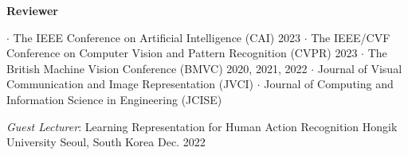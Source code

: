 



\textbf{Reviewer}
\begin{cvskills}
\cvskill
{} %
{\hspace{-3em} \textbf{$\cdot$} The IEEE Conference on Artificial Intelligence (CAI) 2023}
\cvskill
{} %
{\hspace{-3em} \textbf{$\cdot$} The IEEE/CVF Conference on Computer Vision and Pattern Recognition (CVPR) 2023}
\cvskill
{} %
{\hspace{-3em} \textbf{$\cdot$} The British Machine Vision Conference (BMVC) 2020, 2021, 2022}
\cvskill
{} %
{\hspace{-3em} \textbf{$\cdot$} Journal of Visual Communication and Image Representation (JVCI)}
\cvskill
{}
{\hspace{-3em} \textbf{$\cdot$} Journal of Computing and Information Science in Engineering (JCISE)}

\end{cvskills}


\vspace{.5em}

\cventry
{\textit{Guest Lecturer}: Learning Representation for Human Action Recognition}
{Hongik University}
{Seoul, South Korea}
{Dec. 2022}
{}
